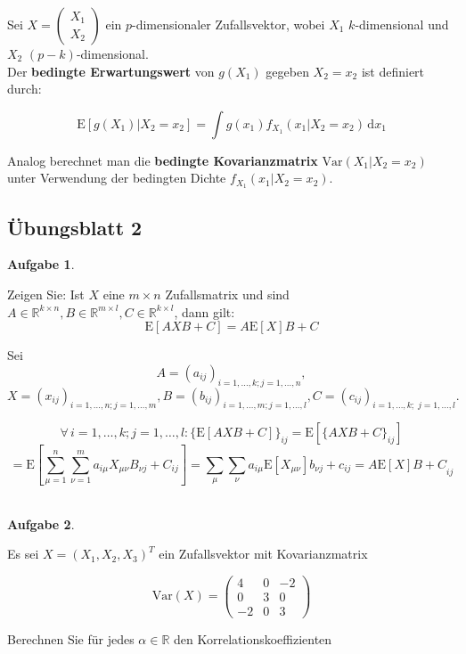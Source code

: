 \documentclass[12pt, a4paper]{article}
\newcommand{\E}{\mbox{I\negthinspace E}}
\theoremstyle{plain}
\theoremstyle{definition}
\newtheorem{aufgabe}{Aufgabe}
\newcommand{\R}{\mathbb{R}}
\newcommand{\1}{\mathds{1}}
\renewcommand{\E}{\mathrm{E}}
\newcommand{\Var}{\mathrm{Var}}
\renewcommand{\d}{\,\mathrm{d}}
\begin{document}
Sei \(X = \begin{pmatrix}X_1\\X_2\end{pmatrix}\) ein \(p\)-dimensionaler Zufallsvektor, wobei \(X_1\) \(k\)-dimensional und \(X_2\) \((p-k)\)-dimensional.\\

Der \textbf{bedingte Erwartungswert} von \(g(X_1)\) gegeben \(X_2=x_2\) ist definiert durch:

\[ \E[g(X_1) | X_2=x_2] = \int g(x_1) f_{X_1}(x_1 | X_2=x_2) \d x_1 \]

Analog berechnet man die \textbf{bedingte Kovarianzmatrix} \(\Var(X_1 | X_2=x_2)\) unter Verwendung der bedingten Dichte \(f_{X_1}(x_1 | X_2=x_2)\).

\newpage
\subsection*{Übungsblatt 2}

\begin{aufgabe} 
\end{aufgabe}

Zeigen Sie: Ist $X$ eine $m \times n $ Zufallsmatrix und sind \(A \in \R^{k\times n}, B \in \R^{m\times l}, C \in \R^{k\times l}\), dann gilt:
\[ \E[AXB + C] = A\E[X]B + C\]

Sei \[A = (a_{ij})_{i=1,\dots,k; j=1,\dots,n},\] 
\[X = (x_{ij})_{i=1,\dots,n; j=1,\dots,m}, B = (b_{ij})_{i=1,\dots,m; j=1,\dots,l}, C = (c_{ij})_{i=1,\ldots, k;\; j=1,\dots,l}.\]

\[ \forall \, i=1,\dots,k; j=1,\dots,l: \{\E[AXB + C]\}_{ij} = \E[\{AXB+C\}_{ij}] \]
\[= \E \left[ \sum_{\mu=1}^n \sum_{\nu=1}^m a_{i \mu}X_{\mu \nu}B_{\nu j} + C_{ij} \right] = \sum_{\mu} \sum_{\nu} a_{i \mu} \E[X_{\mu \nu}] b_{\nu j} + c_{ij} = {A \E[X] B + C}_{ij} \]\\



\begin{aufgabe} 
\end{aufgabe}


Es sei \(X = (X_1,X_2,X_3)^T \) ein Zufallsvektor mit Kovarianzmatrix

\[ \Var(X) = \begin{pmatrix} 4 & 0 & -2 \\ 0 & 3 & 0 \\ -2 & 0 & 3 \end{pmatrix} \]

Berechnen Sie für jedes \(\alpha \in \R\) den Korrelationskoeffizienten
\end{document}
